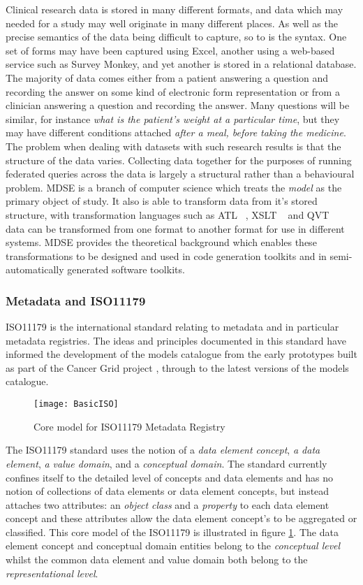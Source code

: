 Clinical research data is stored in many different formats, and data
which may needed for a study may well originate in many different
places. As well as the precise semantics of the data being difficult
to capture, so to is the syntax. One set of forms may have been
captured using Excel, another using a web-based service such as Survey
Monkey, and yet another is stored in a relational database. The
majority of data comes either from a patient answering a question and
recording the answer on some kind of electronic form representation or
from a clinician answering a question and recording the answer. Many
questions will be similar, for instance \emph{what is the patient's
  weight at a particular time}, but they may have different conditions
attached \emph{after a meal, before taking the medicine}. The problem
when dealing with datasets with such research results is that the
structure of the data varies. Collecting data together for the
purposes of running federated queries across the data is largely a
structural rather than a behavioural problem. MDSE is a branch of
computer science which treats the \emph{model} as the primary object
of study. It also is able to transform data from it's stored
structure, with transformation languages such as ATL ~\cite{ATL}, XSLT
~\cite{XSLT} and QVT ~\cite{QVT} data can be transformed from one
format to another format for use in different systems. MDSE provides
the theoretical background which enables these transformations to be
designed and used in code generation toolkits and in
semi-automatically generated software toolkits.

\subsubsection{Metadata and ISO11179}
ISO11179 is the international standard relating to metadata and in particular metadata registries. The ideas and principles documented in this standard have informed the development of the models catalogue from the early prototypes built as part of the Cancer Grid project \cite{crichton2009metadata}, through to the latest versions of the models catalogue.

\begin{figure}[here]
	\texttt{[image: BasicISO]}
	\caption{Core model for ISO11179 Metadata Registry} 
	\label{fig:basicMDR}
\end{figure}

The ISO11179 standard uses the notion of a \emph{data element concept}, \emph{a data element}, \emph{a value domain}, and a \emph{conceptual domain}. The standard currently confines itself to the detailed level of concepts and data elements and has no notion of collections of data elements or data element concepts, but instead attaches two attributes: an \emph{object class} and a \emph{property} to each data element concept and these attributes allow the data element concept's to be aggregated or classified. This core model of the ISO11179 is illustrated in figure \ref{fig:basicMDR}. The data element concept and conceptual domain entities belong to the \emph{conceptual level}  whilst the common data element and value domain both belong to the \emph{representational level}.



